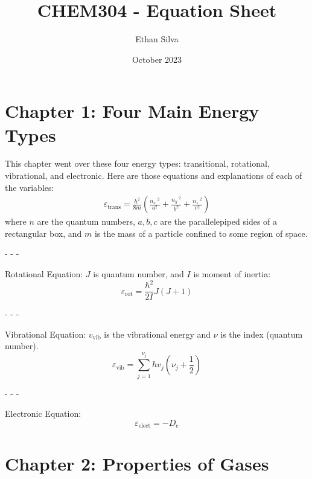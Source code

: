 \documentclass{article}
\title{CHEM304 - Equation Sheet}
\author{Ethan Silva}
\date{October 2023}
\begin{document}
\maketitle

\section{Chapter 1: Four Main Energy Types}

This chapter went over these four energy types: transitional, rotational, vibrational, and electronic. Here are those equations and explanations of each of the variables:
\begin{align*}
    \varepsilon_{\text{trans}}=\frac{h^2}{8m}\left(\frac{n_x\:^2}{a^2}+\frac{n_y\:^2}{b^2}+\frac{n_z\:^2}{c^2}\right)
\end{align*}
where $n$ are the quantum numbers, $a,b,c$ are the parallelepiped sides of a rectangular box, and $m$ is the mass of a particle confined to some region of space. 

\noindent- - - 

\noindent Rotational Equation: $J$ is quantum number, and $I$ is moment of inertia: 
$$\varepsilon_{\text{rot}}=\frac{\hbar^2}{2I}J(J+1)$$

\noindent- - - 

\noindent Vibrational Equation: $v_{\text{vib}}$ is the vibrational energy and $\nu$ is the index (quantum number).
$$\varepsilon_{\text{vib}}=\sum_{j=1}^{\nu_{j}} hv_{j}(\nu_j+\frac{1}{2}) $$

\noindent - - - 

\noindent Electronic Equation: 
$$\varepsilon_{\text{elect}}=-D_e $$

\section{Chapter 2: Properties of Gases}
\end{document}
